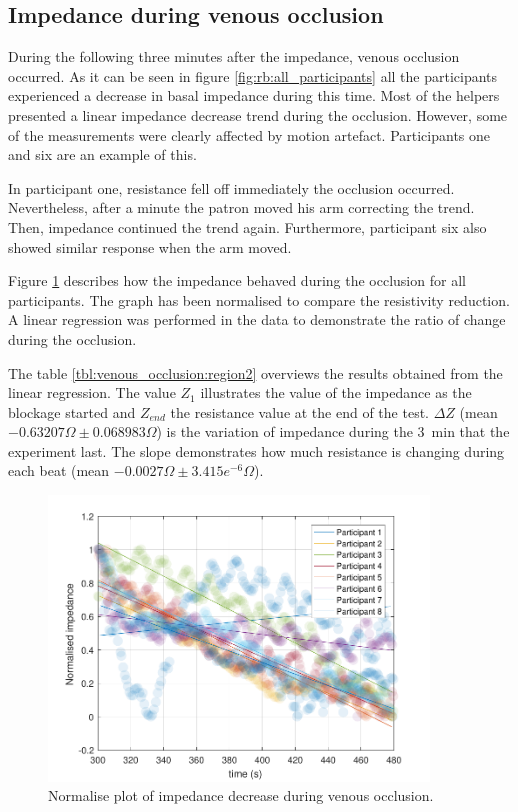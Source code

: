 \subsection{Impedance during venous occlusion}
\label{section5.1.2}
During the following three minutes after the impedance, venous occlusion occurred. As it can be seen in figure \ref{fig:rb:all_participants} all the participants experienced a decrease in basal impedance during this time. Most of the helpers presented a linear impedance decrease trend during the occlusion. However, some of the measurements were clearly affected by motion artefact. Participants one and six are an example of this. 

In participant one, resistance fell off immediately the occlusion occurred. Nevertheless, after a minute the patron moved his arm correcting the trend. Then, impedance continued the trend again. Furthermore,  participant six also showed similar response when the arm moved. 

Figure \ref{fig:normalise:venous_occlusion} describes how the impedance behaved during the occlusion for all participants. The graph has been normalised to compare the resistivity reduction.  A linear regression was performed in the data to demonstrate the ratio of change during the occlusion.  

The table \ref{tbl:venous_occlusion:region2} overviews the results obtained from the linear regression. The value $Z_1$ illustrates the value of the impedance as the blockage started and $Z_{end}$ the resistance value at the end of the test.  $\Delta Z$ (mean $-0.63207 \Omega \pm0.068983\Omega$) is the variation of impedance during the \SI{3}{\minute} that the experiment last.  The slope demonstrates how much resistance is changing during each beat  (mean $-0.0027\Omega\pm3.415e^{-6}\Omega$). 

 \begin{figure}
 	\centering
 	\includegraphics[width=0.9\textwidth,height=0.9\textheight,keepaspectratio]{figure3}    
 	\caption{Normalise plot of impedance decrease during venous occlusion.}
 	\label{fig:normalise:venous_occlusion}
 \end{figure}

